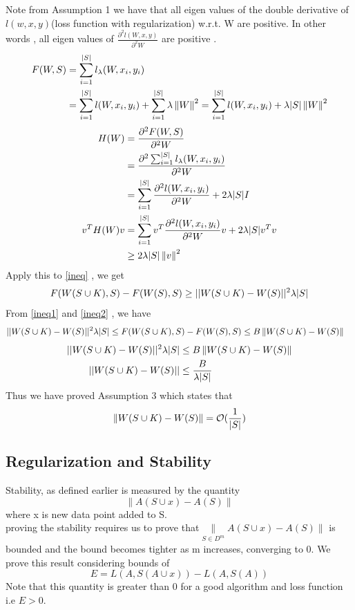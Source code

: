 \documentclass[12pt]{article}
\begin{document}
Note from Assumption 1 we have that all eigen values of the double derivative of $l(w,x,y)$(loss function with regularization) w.r.t. W  are positive. In other words , all eigen values of $\frac{\partial^2 l(W,x,y)}{\partial^2 W}$ are positive .  
\begin{align}
    F(W,S) &=  \sum_{i = 1}^{|S|} l_{\lambda}(W,x_i,y_i) \nonumber\\
          &=  \sum_{i = 1}^{|S|}l(W,x_i,y_i) + \sum_{i = 1}^{|S|} \lambda \left\Vert W\right\Vert^2  = \sum_{i = 1}^{|S|}l(W,x_i,y_i) + \lambda|S|\left\Vert W\right\Vert^2\nonumber
\end{align}
\begin{align}
    H(W)   &=  \frac{\partial^2 F(W,S)}{\partial^2 W} \nonumber\\
           &=  \frac{\partial^2 \sum_{i = 1}^{|S|} l_{\lambda}(W,x_i,y_i)}{\partial^2 W}\nonumber\\
           &=  \sum_{i = 1}^{|S|} \frac{\partial^2 l(W,x_i,y_i)}{\partial^2 W} + 2\lambda |S| I\nonumber\\
   v^TH(W)v &=  \sum_{i = 1}^{|S|} v^T\frac{\partial^2 l(W,x_i,y_i)}{\partial^2 W}v + 2\lambda |S| v^Tv\nonumber\\
         & \geq 2\lambda |S|\left\Vert v\right\Vert^2 \nonumber
\end{align}
Apply this to \eqref{ineq} , we get 
\begin{equation}
    \label{ineq2}
    F(W(S \cup K),S) - F(W(S),S) \geq ||W(S \cup K) - W(S)||^2 \lambda |S|
\end{equation}
From \ref{ineq1} and \ref{ineq2} , we have 
\begin{align*}
    ||W(S \cup K) - W(S)||^2 \lambda |S| &\leq F(W(S \cup K),S) - F(W(S),S) \leq B\left\Vert W(S \cup K) - W(S)\right\Vert 
\end{align*}
\begin{align*}
    ||W(S \cup K) - W(S)||^2 \lambda |S| &\leq  B\left\Vert W(S \cup K) - W(S)\right\Vert \\
    ||W(S \cup K) - W(S)||  &\leq \frac{B}{\lambda |S|}
\end{align*}
Thus we have proved Assumption 3 which states that  
\begin{equation}
    \left\Vert W(S \cup K) - W(S)\right\Vert  = {\cal O}(\frac{1}{|S|})
\end{equation}


\subsection{Regularization and Stability}
Stability, as defined earlier is measured by the quantity
\[
    \|A(S \cup x)-A(S)\| 
\]
where x is new data point added to S.\\
proving the stability requires us to prove that$\underset{S \in D^m}{\|}A(S \cup x)-A(S)\|$ is bounded and the bound becomes tighter as m increases, converging to 0. We prove this result considering bounds of 
\[
    E=L(A,S(A \cup x)) - L(A,S(A))
\]
Note that this quantity is greater than 0 for a good algorithm and loss function i.e $E>0$.
\vspace{-10pt}
\end{document}
